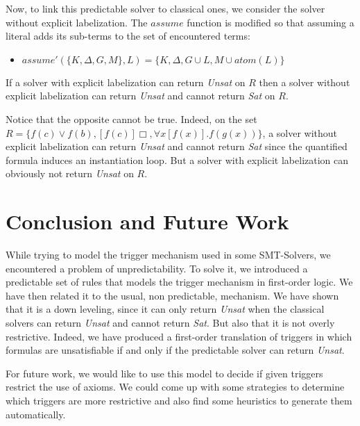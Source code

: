 \documentclass[a4paper,11pt]{article}
\newcommand{\atom}{\mathit{atom}}
\newcommand{\A}{\mathit{assume}}
\begin{document}
Now, to link this predictable solver to classical ones,
we consider the solver without explicit labelization. The $\A$ function is modified so that
assuming a literal adds its sub-terms to the set of encountered terms:
\begin{itemize}
 \item $\A'(\{K,\Delta,G,M\},L) = \{K,\Delta,G\cup L, M\cup\atom(L)\}$
\end{itemize}

{\theorem If a solver with explicit labelization can return \emph{Unsat} on $R$ then
a solver without explicit labelization can return \emph{Unsat} and cannot return \emph{Sat} on $R$.}

Notice that the opposite cannot be true. Indeed, on the set
$R=\{f(c)\vee f(b), [f(c)]\Box, \forall x[f(x)]. f(g(x))\}$, a solver without explicit labelization
can return \emph{Unsat} and cannot return \emph{Sat} since the quantified formula induces an
instantiation loop. But a solver with explicit labelization can obviously not return \emph{Unsat} on
$R$.

\section{Conclusion and Future Work}
While trying to model the trigger mechanism used in some SMT-Solvers, we encountered a problem of
unpredictability. To solve it, we introduced a predictable set of rules that models the trigger
mechanism in first-order logic. We have then related it to the usual, non predictable, mechanism.
We have shown that it is a down leveling, since it can only return \emph{Unsat} when the
classical solvers can return \emph{Unsat} and cannot return \emph{Sat}. But also that it is not overly
restrictive. Indeed, we have produced a first-order translation of triggers in which formulas are
unsatisfiable if and only if the predictable solver can return \emph{Unsat}.

For future work, we would like to use this model to decide if given triggers restrict the use of axioms.
We could come up with some strategies to determine which triggers are more restrictive and
also find some heuristics to generate them automatically.



\end{document}
